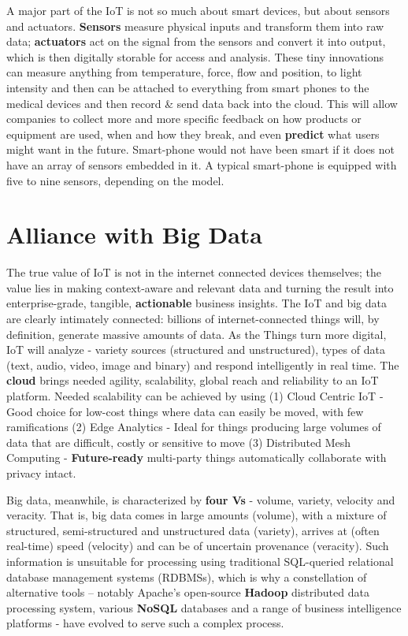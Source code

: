 \documentclass[sigconf]{acmart}
\begin{document}
A major part of the IoT is not so much about smart devices, but about sensors and actuators. \textbf{Sensors} measure physical inputs and transform them into raw data; \textbf{actuators} act on the signal from the sensors and convert it into output, which is then digitally storable for access and analysis.  These tiny innovations can measure anything from temperature, force, flow and position, to light intensity and then can be attached to everything from smart phones to the medical devices and then record \& send data back into the cloud.  This will allow companies to collect more and more specific feedback on how products or equipment are used, when and how they break, and even \textbf{predict} what users might want in the future. Smart-phone would not have been smart if it does not have an array of sensors embedded in it. A typical smart-phone is equipped with five to nine sensors, depending on the model.


\section{Alliance with Big Data}

The true value of IoT is not in the internet connected devices themselves; the value lies in making context-aware and relevant data and turning the result into enterprise-grade, tangible, \textbf{actionable} business insights. The IoT and big data are clearly intimately connected: billions of internet-connected things will, by definition, generate massive amounts of data. As the Things turn more digital, IoT will analyze - variety sources (structured and unstructured), types of data (text, audio, video, image and binary) and respond intelligently in real time. The \textbf{cloud} brings needed agility, scalability, global reach and reliability to an IoT platform. Needed scalability can be achieved by using (1) Cloud Centric IoT - Good choice for low-cost things where data can easily be moved, with few ramifications (2) Edge Analytics - Ideal for things producing large volumes of data that are difficult, costly or sensitive to move (3) Distributed Mesh Computing - \textbf{Future-ready} multi-party things automatically collaborate with privacy intact.

Big data, meanwhile, is characterized by \textbf{four Vs} - volume, variety, velocity and veracity. That is, big data comes in large amounts (volume), with a mixture of structured, semi-structured and unstructured data (variety), arrives at (often real-time) speed (velocity) and can be of uncertain provenance (veracity). Such information is unsuitable for processing using traditional SQL-queried relational database management systems (RDBMSs), which is why a constellation of alternative tools -- notably Apache's open-source \textbf{Hadoop} distributed data processing system, various \textbf{NoSQL} databases and a range of business intelligence platforms - have evolved to serve such a complex process.
\end{document}
